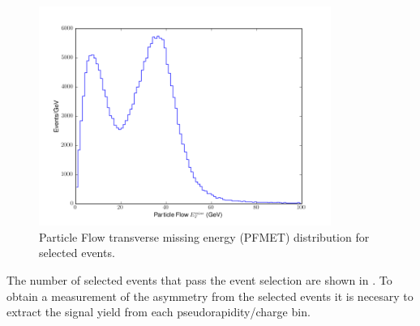 \begin{figure}[htbp]
  \begin{center}
    \includegraphics*[width=0.85\textwidth]{pfmet_dist}
    \caption{Particle Flow transverse missing energy (PFMET) distribution for selected events.}
  \label{fig:pfmet}
  \end{center}
\end{figure}

The number of selected events that pass the
event selection are shown in . To obtain a
measurement of the asymmetry from the selected events it is necesary to extract
the signal yield from each pseudorapidity/charge bin.


